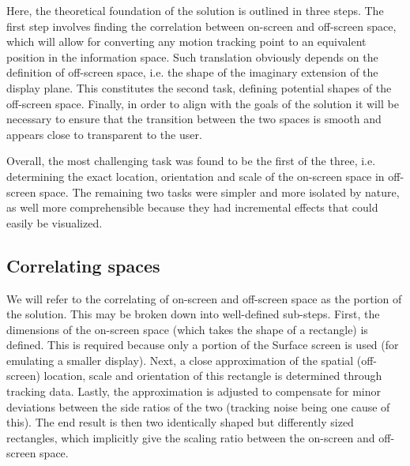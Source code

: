 	
\noi
Here, the theoretical foundation of the solution is outlined in three steps. The first step involves finding the correlation between on-screen and off-screen space, which will  allow for converting any motion tracking point to an equivalent position in the information space. Such translation obviously depends on the definition of off-screen space, i.e. the shape of the imaginary extension of the display plane. This constitutes the second task, defining potential shapes of the off-screen space. Finally, in order to align with the goals of the solution it will be necessary to ensure that the transition between the two spaces is smooth and appears close to transparent to the user. 

\newcommand\plotClass[3]{
	\addplot[ scatter, point meta=explicit symbolic, discard if not={label}{#1}, color=#2,
	scatter/classes={
		#1={#3,mark=*,mark size=3pt}
	},
	] table[meta=label] {data/projection.csv} 
}


Overall, the most challenging task was found to be the first of the three, i.e. determining the exact location, orientation and scale of the on-screen space in off-screen space. The remaining two tasks were simpler and more isolated by nature, as well more comprehensible because they had incremental effects that could easily be visualized.\\

\subsection{Correlating spaces}

We will refer to the correlating of on-screen and off-screen space as the  portion of the solution. This may be broken down into well-defined sub-steps. First, the dimensions of the on-screen space (which takes the shape of a rectangle) is defined. This is required because only a portion of the Surface screen is used (for emulating a smaller display). Next, a close approximation of the spatial  (off-screen) location, scale and orientation of this rectangle is determined through tracking data. Lastly, the approximation is adjusted to compensate for minor deviations between the side ratios of the two (tracking noise being one cause of this). The end result is then two identically shaped but differently sized rectangles, which implicitly give the scaling ratio between the on-screen and off-screen space.

